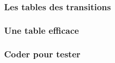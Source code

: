 \subsubsection{Les tables des transitions}

	


\subsubsection{Une table efficace} \label{better-2-and-3}

	


\subsubsection{Coder pour tester}

	
